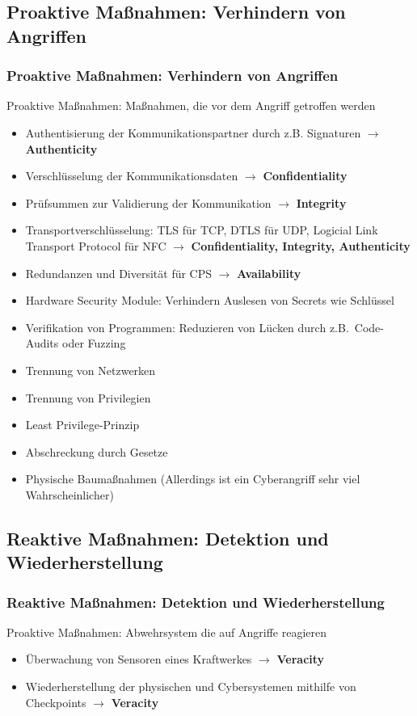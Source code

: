 \documentclass{sikslides}
\begin{document}
    \subsection{Proaktive Maßnahmen: Verhindern von Angriffen}
    \begin{frame}[allowframebreaks]
        \frametitle{Proaktive Maßnahmen: Verhindern von Angriffen}
        Proaktive Maßnahmen: Maßnahmen, die vor dem Angriff getroffen werden
        \vspace{20px}
        \begin{itemize}
            \item Authentisierung der Kommunikationspartner durch z.B. Signaturen $\rightarrow$ \textbf{Authenticity}
            \item Verschlüsselung der Kommunikationsdaten $\rightarrow$ \textbf{Confidentiality}
            \item Prüfsummen zur Validierung der Kommunikation $\rightarrow$ \textbf{Integrity}
            \framebreak
            \item Transportverschlüsselung: TLS für TCP, DTLS für UDP, Logicial Link Transport Protocol für NFC $\rightarrow$ \textbf{Confidentiality, Integrity, Authenticity}
            \item Redundanzen und Diversität für CPS $\rightarrow$ \textbf{Availability}
            \item Hardware Security Module: Verhindern Auslesen von Secrets wie Schlüssel
            \item Verifikation von Programmen: Reduzieren von Lücken durch z.B.\ Code-Audits oder Fuzzing
            \framebreak
            \item Trennung von Netzwerken
            \item Trennung von Privilegien
            \item Least Privilege-Prinzip
            \framebreak
            \item Abschreckung durch Gesetze
            \item Physische Baumaßnahmen (Allerdings ist ein Cyberangriff sehr viel Wahrscheinlicher)
        \end{itemize}
    \end{frame}

    \subsection{Reaktive Maßnahmen: Detektion und Wiederherstellung}
    \begin{frame}
        \frametitle{Reaktive Maßnahmen: Detektion und Wiederherstellung}
        Proaktive Maßnahmen: Abwehrsystem die auf Angriffe reagieren
        \begin{itemize}
            \item Überwachung von Sensoren eines Kraftwerkes $\rightarrow$ \textbf{Veracity}
            \item Wiederherstellung der physischen und Cybersystemen mithilfe von Checkpoints $\rightarrow$ \textbf{Veracity}
        \end{itemize}
    \end{frame}
\end{document}
